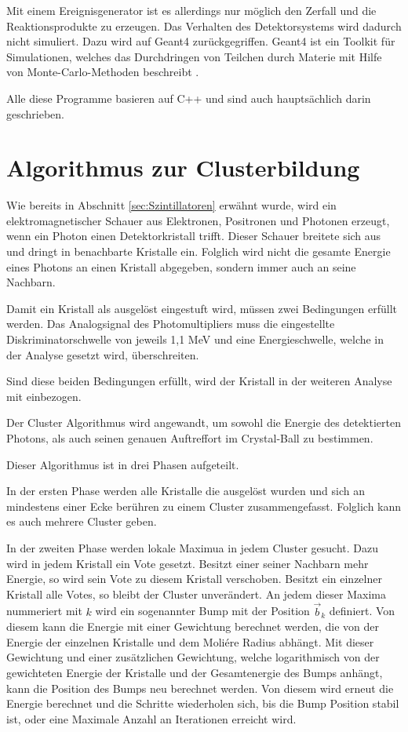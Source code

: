 \documentclass[a4paper,11pt,oneside,final,german,openbib,pdftex]{scrbook}
\begin{document}
{Mit einem Ereignisgenerator ist es allerdings nur m\"oglich den Zerfall und die Reaktionsprodukte zu erzeugen. Das Verhalten des Detektorsystems wird dadurch nicht simuliert. Dazu wird auf Geant4 zur\"uckgegriffen. Geant4 ist ein Toolkit f\"ur Simulationen, welches das Durchdringen von Teilchen durch Materie mit Hilfe von Monte-Carlo-Methoden beschreibt \cite{Ge04}.

Alle diese Programme basieren auf C++ und sind auch haupts\"achlich darin geschrieben.

\section{Algorithmus zur Clusterbildung}
\label{sec:Clustering-Algorithmus}

Wie bereits in Abschnitt \ref{sec:Szintillatoren} erw\"ahnt wurde, wird ein elektromagnetischer Schauer aus Elektronen, Positronen und Photonen erzeugt, wenn ein Photon einen Detektorkristall trifft. Dieser Schauer breitete sich aus und dringt in benachbarte Kristalle ein. Folglich wird nicht die gesamte Energie eines Photons an einen Kristall abgegeben, sondern immer auch an seine Nachbarn.

Damit ein Kristall als ausgel\"ost eingestuft wird, m\"ussen zwei Bedingungen erf\"ullt werden.
Das Analogsignal des Photomultipliers muss die eingestellte Diskriminatorschwelle von jeweils 1,1 MeV und eine Energieschwelle, welche in der Analyse gesetzt wird, \"uberschreiten.

Sind diese beiden Bedingungen erf\"ullt, wird der Kristall in der weiteren Analyse mit einbezogen.
 
 Der Cluster Algorithmus wird angewandt, um sowohl die Energie des detektierten Photons, als auch seinen genauen Auftreffort im Crystal-Ball zu bestimmen.
 
 Dieser Algorithmus ist in drei Phasen aufgeteilt.
 
 In der ersten Phase werden alle Kristalle die ausgel\"ost wurden und sich an mindestens einer Ecke ber\"uhren zu einem Cluster zusammengefasst. Folglich kann es auch mehrere Cluster geben.
 
 In der zweiten Phase werden lokale Maximua in jedem Cluster gesucht. Dazu wird in jedem Kristall ein Vote gesetzt. Besitzt einer seiner Nachbarn mehr Energie, so wird sein Vote zu diesem Kristall verschoben. Besitzt ein einzelner Kristall alle Votes, so bleibt der Cluster unver\"andert. An jedem dieser Maxima nummeriert mit $k$ wird ein sogenannter Bump mit der Position $\vec{b}_k$ definiert. Von diesem kann die Energie mit einer Gewichtung berechnet werden, die von der Energie der einzelnen Kristalle und dem Moli\'ere Radius abh\"angt. Mit dieser Gewichtung und einer zus\"atzlichen Gewichtung, welche logarithmisch von der gewichteten Energie der Kristalle und der Gesamtenergie des Bumps anh\"angt, kann die Position des Bumps neu berechnet werden. Von diesem wird erneut die Energie berechnet und die Schritte wiederholen sich, bis die Bump Position stabil ist, oder eine Maximale Anzahl an Iterationen erreicht wird.
 
}
\end{document}
